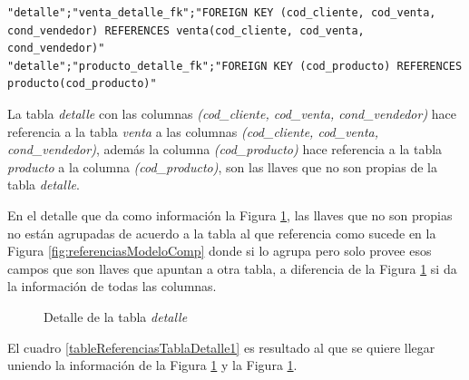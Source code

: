 \lstset{language=sql,breaklines=true}
\begin{lstlisting}
"detalle";"venta_detalle_fk";"FOREIGN KEY (cod_cliente, cod_venta, cond_vendedor) REFERENCES venta(cod_cliente, cod_venta, cond_vendedor)"
"detalle";"producto_detalle_fk";"FOREIGN KEY (cod_producto) REFERENCES producto(cod_producto)"
\end{lstlisting}
La tabla \textit{detalle} con las columnas \textit{(cod\_cliente, cod\_venta, cond\_vendedor)} hace referencia a la tabla \textit{venta} a las columnas \textit{(cod\_cliente, cod\_venta, cond\_vendedor)}, adem\'as la columna \textit{(cod\_producto)} hace referencia a la tabla \textit{producto} a la columna \textit{(cod\_producto)}, son las llaves que no son propias de la tabla \textit{detalle}.

En el detalle que da como informaci\'on la Figura \ref{fig:detalleTablaDetalle},  las llaves que no son propias no est\'an agrupadas de acuerdo a la tabla al que referencia como sucede en la Figura \ref{fig:referenciasModeloComp} donde si lo agrupa pero solo provee esos campos que son llaves que apuntan a otra tabla, a diferencia de la Figura \ref{fig:detalleTablaDetalle} si da la informaci\'on de todas las columnas.

\begin{figure}[H]
\centering
{}
\caption{Detalle de la tabla \textit{detalle}} \label{fig:detalleTablaDetalle}
\end{figure}
El cuadro \ref{tableReferenciasTablaDetalle1} es resultado al que se quiere llegar uniendo la informaci\'on de la Figura \ref{fig:detalleTablaDetalle} y la Figura \ref{fig:detalleTablaDetalle}.

